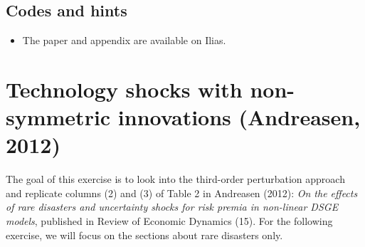 \documentclass{article}
\begin{document}
\subsection*{Codes and hints}
\begin{itemize}
\item The paper and appendix are available on Ilias.
\end{itemize}

\newpage

\section[Technology shocks with non-symmetric innovations (Andreasen, 2012)]{Technology shocks with non-symmetric innovations (Andreasen, 2012)\label{ex:Andreasen_2012}}
The goal of this exercise is to look into the third-order perturbation approach and replicate columns (2) and (3) of Table 2 in Andreasen (2012): \emph{On the effects of rare disasters and uncertainty shocks for risk premia in non-linear DSGE models},
  published in Review of Economic Dynamics (15).
For the following exercise, we will focus on the sections about rare disasters only.
\end{document}
